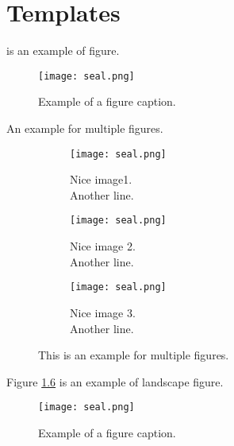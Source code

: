 \chapter{Templates}


\begin{tempsection}
     is an example of figure.
    \begin{figure}[htbp]
        \centerline{\texttt{[image: seal.png]}}
        \caption{Example of a figure caption.}
        \label{fig}
    \end{figure}

    An example for multiple figures.
    \begin{figure}[htbp]
        \centering
        \begin{subfigure}{0.31\columnwidth}
            \centering
            \texttt{[image: seal.png]}
            \caption{Nice image1. \\ Another line.}
            \label{fig:multiple_figures_a}
        \end{subfigure}
        \begin{subfigure}{0.31\columnwidth}
            \centering
            \texttt{[image: seal.png]}
            \caption{Nice image 2. \\ Another line.}
            \label{fig:multiple_figures_b}
        \end{subfigure}
        \begin{subfigure}{0.31\columnwidth}
            \centering
            \texttt{[image: seal.png]}
            \caption{Nice image 3. \\ Another line.}
            \label{fig:multiple_figures_c}
        \end{subfigure}
        \caption{This is an example for multiple figures.}
        \label{fig:multiple_figures}
    \end{figure}

    Figure \ref{fig2} is an example of landscape figure.
    \begin{landscape}
    \begin{figure}[htbp]
        \centerline{\texttt{[image: seal.png]}}
        \caption{Example of a figure caption.}
        \label{fig2}
    \end{figure}
    \end{landscape}


\end{tempsection}
